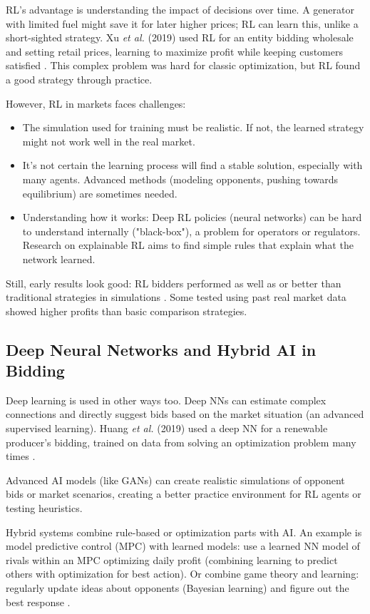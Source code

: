 \documentclass[conference]{IEEEtran}
\begin{document}
RL's advantage is understanding the impact of decisions over time. A generator with limited fuel might save it for later higher prices; RL can learn this, unlike a short-sighted strategy. Xu \textit{et al.} (2019) used RL for an entity bidding wholesale and setting retail prices, learning to maximize profit while keeping customers satisfied \cite{Xu2019}. This complex problem was hard for classic optimization, but RL found a good strategy through practice.

However, RL in markets faces challenges:
\begin{itemize}
    \item The simulation used for training must be realistic. If not, the learned strategy might not work well in the real market.
    \item It's not certain the learning process will find a stable solution, especially with many agents. Advanced methods (modeling opponents, pushing towards equilibrium) are sometimes needed.
    \item Understanding how it works: Deep RL policies (neural networks) can be hard to understand internally ("black-box"), a problem for operators or regulators. Research on explainable RL aims to find simple rules that explain what the network learned.
\end{itemize}
Still, early results look good: RL bidders performed as well as or better than traditional strategies in simulations \cite{Wang2019, Yang2020DRL}. Some tested using past real market data showed higher profits than basic comparison strategies.

\subsection{Deep Neural Networks and Hybrid AI in Bidding}

Deep learning is used in other ways too. Deep NNs can estimate complex connections and directly suggest bids based on the market situation (an advanced supervised learning). Huang \textit{et al.} (2019) used a deep NN for a renewable producer's bidding, trained on data from solving an optimization problem many times \cite{Huang2019}.

Advanced AI models (like GANs) can create realistic simulations of opponent bids or market scenarios, creating a better practice environment for RL agents or testing heuristics.

Hybrid systems combine rule-based or optimization parts with AI. An example is model predictive control (MPC) with learned models: use a learned NN model of rivals within an MPC optimizing daily profit (combining learning to predict others with optimization for best action). Or combine game theory and learning: regularly update ideas about opponents (Bayesian learning) and figure out the best response \cite{Yang2018}.
\end{document}
